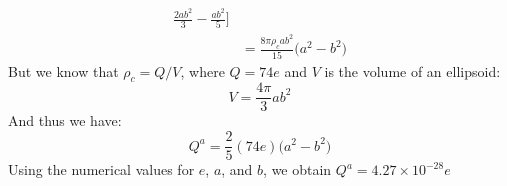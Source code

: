 \documentclass[crop=false,class=book,oneside]{standalone}
\begin{document}
\begin{solution}
\begin{subequations}
\begin{align}
                                     \frac{2ab^{2}}{3}-
                                     \frac{ab^{2}}{5}\Big]\\
                            &=\frac{8\pi\rho_{c}ab^{2}}{15}
                                \big(a^{2}-b^{2}\big)
                    \end{align}
                \end{subequations}
                But we know that $\rho_{c}=Q/V$, where $Q=74e$ and
                $V$ is the volume of an ellipsoid:
                \begin{equation}
                    V=\frac{4\pi}{3}ab^{2}
                \end{equation}
                And thus we have:
                \begin{equation}
                    Q^{a}=\frac{2}{5}(74e)\big(a^{2}-b^{2}\big)
                \end{equation}
                Using the numerical values for $e$, $a$, and $b$, we
                obtain $Q^{a}=4.27\times{10}^{-28}e$
            \end{solution}
\end{document}

